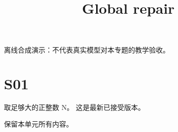 \documentclass[UTF8,fontset=fandol,11pt]{ctexart}
\title{Global repair}
\date{}
\begin{document}
\maketitle
\par\noindent 离线合成演示：不代表真实模型对本专题的教学验收。\par
\section{S01}\label{sec:S01}
取足够大的正整数 N。 这是最新已接受版本。\par
保留本单元所有内容。\par
\end{document}
